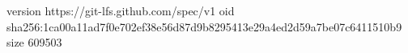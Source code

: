 version https://git-lfs.github.com/spec/v1
oid sha256:1ca00a11ad7f0e702ef38e56d87d9b8295413e29a4ed2d59a7be07c6411510b9
size 609503
